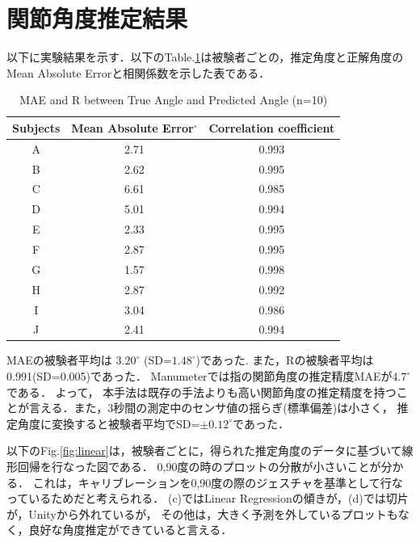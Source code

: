 \section{関節角度推定結果}


以下に実験結果を示す．以下のTable.\ref{table:data_type}は被験者ごとの，推定角度と正解角度のMean Absolute Errorと相関係数を示した表である．


\begin{table}[H]
  \caption{MAE and R between{}
True Angle and Predicted Angle (n=10)}
  \label{table:data_type}
  \centering
  \begin{tabular}{ccc}
    \hline
    Subjects  & Mean Absolute Error$^\circ$  & Correlation coefficient  \\
    \hline \hline
    A  & 2.71 & 0.993\\
    B  & 2.62 & 0.995\\
    C  & 6.61 & 0.985\\
    D  & 5.01 & 0.994\\
    E  & 2.33 & 0.995\\ 
    F  & 2.87 & 0.995\\
    G  & 1.57 & 0.998\\
    H  & 2.87 & 0.992\\
    I  & 3.04 & 0.986\\
    J  & 2.41 & 0.994\\
    \hline
  \end{tabular}
\end{table}

MAEの被験者平均は $3.20^\circ$ (SD=$1.48^\circ$)であった.
また，Rの被験者平均は0.991(SD=0.005)であった．
Manumeterでは指の関節角度の推定精度MAEが$4.7^\circ$である\cite{Friedman2014}．
よって， 本手法は既存の手法よりも高い関節角度の推定精度を持つことが言える．また，3秒間の測定中のセンサ値の揺らぎ(標準偏差)は小さく，
推定角度に変換すると被験者平均でSD=$\pm0.12^\circ$であった．

以下のFig.\ref{fig:linear}は，被験者ごとに，得られた推定角度のデータに基づいて線形回帰を行なった図である．
0,90度の時のプロットの分散が小さいことが分かる．
これは，キャリブレーションを0,90度の際のジェスチャを基準として行なっているためだと考えられる．
(c)ではLinear Regressionの傾きが，(d)では切片が，Unityから外れているが，
その他は，大きく予測を外しているプロットもなく，良好な角度推定ができていると言える．

